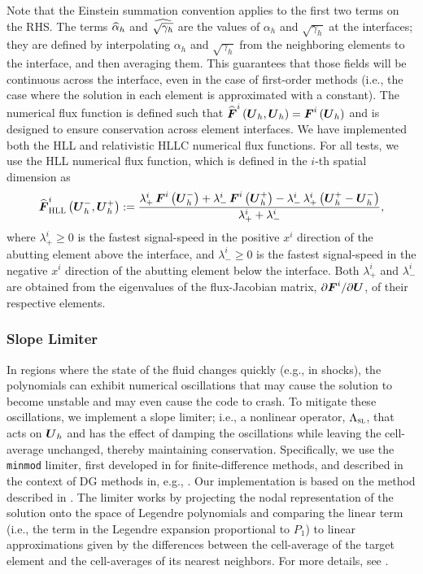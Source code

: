 Note that the Einstein summation convention applies to the
first two terms on the RHS.
The terms $\widehat{\alpha}_{h}$ and $\widehat{\sqrt{\gamma_{h}}}$
are the values of $\alpha_{h}$ and $\sqrt{\gamma_{h}}$ at the interfaces;
they are defined by interpolating
$\alpha_{h}$ and $\sqrt{\gamma_{h}}$ from the neighboring
elements to the interface, and then averaging them.
This guarantees that those fields will be continuous across the interface,
even in the case of first-order methods (i.e., the case where the solution
in each element is approximated with a constant).
The numerical flux function is defined such that
$\widehat{\boldsymbol{F}}^{i}\left(\boldsymbol{U}_{h},\boldsymbol{U}_{h}\right)
=\boldsymbol{F}^{i}\left(\boldsymbol{U}_{h}\right)$ and is designed to ensure
conservation across element interfaces.
We have implemented both the HLL \citep{hll1983}
and relativistic HLLC \citep{mb2005} numerical flux functions.
For all tests, we use the HLL numerical flux function,
which is defined in the $i$-th spatial dimension as
\citep{mb2005}
\begin{equation}
  \widehat{\boldsymbol{F}}_{\textsc{HLL}}^{i}\left(\boldsymbol{U}_{h}^{-},\boldsymbol{U}_{h}^{+}\right)
  :=\frac{
   \lambda_{+}^{i}\,\boldsymbol{F}^{i}\left(\boldsymbol{U}_{h}^{-}\right)
  +\lambda_{-}^{i}\,\boldsymbol{F}^{i}\left(\boldsymbol{U}_{h}^{+}\right)
  -\lambda_{-}^{i}\,\lambda_{+}^{i}
  \left(\boldsymbol{U}_{h}^{+}-\boldsymbol{U}_{h}^{-}\right)}
  {\lambda_{+}^{i}+\lambda_{-}^{i}},
\end{equation}
where $\lambda_{+}^{i}\geq0$ is the fastest
signal-speed in the positive $x^{i}$ direction of the abutting element above
the interface,
and
$\lambda_{-}^{i}\geq0$ is the fastest
signal-speed in the negative $x^{i}$ direction of the abutting element below
the interface.
Both $\lambda_{+}^{i}$ and $\lambda_{-}^{i}$
are obtained from the eigenvalues of the flux-Jacobian matrix,
$\partial\boldsymbol{F}^{i}/\partial\boldsymbol{U}$,
of their respective elements.

\subsubsection{Slope Limiter}

In regions where the state of the fluid changes quickly (e.g., in shocks),
the polynomials can exhibit numerical
oscillations that may cause the solution to become unstable and may even
cause the code to crash.
To mitigate these oscillations, we implement a slope limiter;
i.e., a nonlinear operator, $\Lambda_{\textsc{sl}}$, that acts on $\boldsymbol{U}_{h}$
and has the effect of damping the oscillations while leaving the
cell-average unchanged, thereby maintaining conservation.
Specifically, we use the \texttt{minmod} limiter,
first developed in \cite{h1983} for finite-difference methods,
and described in the context of DG methods in, e.g., \citet{s1987}.
Our implementation is based on the method described in \citet{sbc2015}.
The limiter works by projecting the nodal representation of the solution
onto the space of Legendre polynomials and comparing the linear
term (i.e., the term in the Legendre expansion proportional to $P_{1}$)
to linear approximations given by the differences between the cell-average
of the target element and the cell-averages of its nearest neighbors.
For more details, see \citet{pbe2021}.

